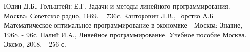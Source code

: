 \documentclass[a4paper,12pt]{article}
\begin{document}
	\begin{thebibliography}{3}
		Юдин Д.Б., Гольштейн Е.Г. Задачи и методы линейного
		программирования. – Москва: Советское радио, 1969. – 736с.
		Канторович Л.В., Горстко А.Б. Математическое оптимальное программирование 
		в экономике - Москва: Знание, 1968. - 96с.
		Палий И.А., Линейное программирование. Учебное пособие Москва: Эксмо, 2008. - 256 с.
	\end{thebibliography}
\end{document}
